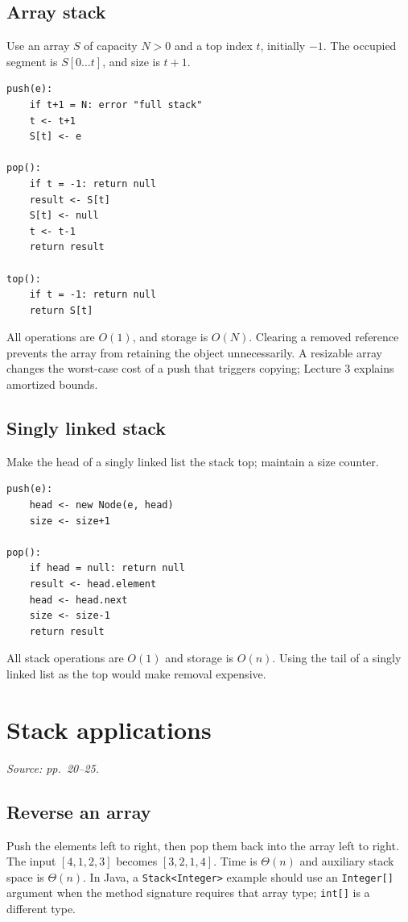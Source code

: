 \documentclass[11pt]{article}
\begin{document}
\subsection{Array stack}
Use an array $S$ of capacity $N>0$ and a top index $t$, initially $-1$. The occupied segment is $S[0\ldots t]$, and size is $t+1$.
\begin{lstlisting}
push(e):
    if t+1 = N: error "full stack"
    t <- t+1
    S[t] <- e

pop():
    if t = -1: return null
    result <- S[t]
    S[t] <- null
    t <- t-1
    return result

top():
    if t = -1: return null
    return S[t]
\end{lstlisting}
All operations are $O(1)$, and storage is $O(N)$. Clearing a removed reference prevents the array from retaining the object unnecessarily. A resizable array changes the worst-case cost of a push that triggers copying; Lecture 3 explains amortized bounds.

\subsection{Singly linked stack}
Make the head of a singly linked list the stack top; maintain a size counter.
\begin{lstlisting}
push(e):
    head <- new Node(e, head)
    size <- size+1

pop():
    if head = null: return null
    result <- head.element
    head <- head.next
    size <- size-1
    return result
\end{lstlisting}
All stack operations are $O(1)$ and storage is $O(n)$. Using the tail of a singly linked list as the top would make removal expensive.

\section{Stack applications}
\textit{Source: pp.\ 20--25.}

\subsection{Reverse an array}
Push the elements left to right, then pop them back into the array left to right. The input $[4,1,2,3]$ becomes $[3,2,1,4]$. Time is $\Theta(n)$ and auxiliary stack space is $\Theta(n)$. In Java, a \texttt{Stack<Integer>} example should use an \texttt{Integer[]} argument when the method signature requires that array type; \texttt{int[]} is a different type.
\end{document}
